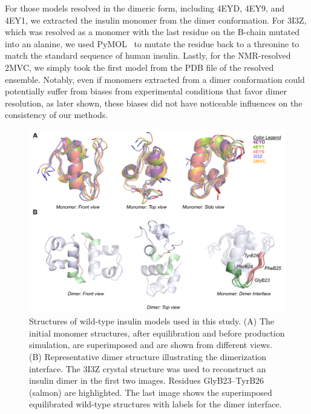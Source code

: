 \documentclass[9pt]{elife}
\begin{document}
For those models resolved in the dimeric form, including 4EYD, 4EY9, and 4EY1, we extracted the insulin monomer from the dimer conformation. For 3I3Z, which was resolved as a monomer with the last residue on the B-chain mutated into an alanine, we used PyMOL~\cite{delano2002pymol} to mutate the residue back to a threonine to match the standard sequence of human insulin. Lastly, for the NMR-resolved 2MVC, we simply took the first model from the PDB file of the resolved ensemble. Notably, even if monomers extracted from a dimer conformation could potentially suffer from biases from experimental conditions that favor dimer resolution, as later shown, these biases did not have noticeable influences on the consistency of our methods. 

\begin{figure}[H]
\centering
\includegraphics[width=\textwidth]{Figures/Fig_WTmodels_dimerInterface.png}
\caption{Structures of wild-type insulin models used in this study. (A) The initial monomer structures, after equilibration and before production simulation, are superimposed and are shown from different views. (B) Representative dimer structure illustrating the dimerization interface. The 3I3Z crystal structure was used to reconstruct an insulin dimer in the first two images. Residues GlyB23--TyrB26 (salmon) are highlighted. The last image shows the superimposed equilibrated wild-type structures with labels for the dimer interface.}
\label{starting_structures}
\end{figure}
\end{document}
